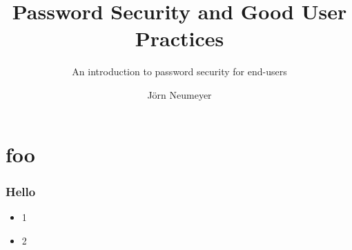 \documentclass{beamer}
\title[Password Security]{Password Security and Good User Practices}
\subtitle{An introduction to password security for end-users}
\author{J\"orn Neumeyer}
\begin{document}
  \frame{\titlepage}
  \section{foo}
  \begin{frame}
  \frametitle{Hello}
    \begin{itemize}
      \item<1-> 1
      \item<2-> 2
    \end{itemize}
  \end{frame}
\end{document}
